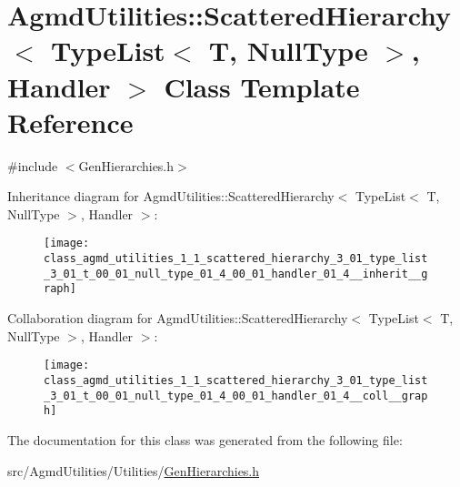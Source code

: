 \hypertarget{class_agmd_utilities_1_1_scattered_hierarchy_3_01_type_list_3_01_t_00_01_null_type_01_4_00_01_handler_01_4}{\section{Agmd\+Utilities\+:\+:Scattered\+Hierarchy$<$ Type\+List$<$ T, Null\+Type $>$, Handler $>$ Class Template Reference}
\label{class_agmd_utilities_1_1_scattered_hierarchy_3_01_type_list_3_01_t_00_01_null_type_01_4_00_01_handler_01_4}
}


{\ttfamily \#include $<$Gen\+Hierarchies.\+h$>$}



Inheritance diagram for Agmd\+Utilities\+:\+:Scattered\+Hierarchy$<$ Type\+List$<$ T, Null\+Type $>$, Handler $>$\+:\nopagebreak
\begin{figure}[H]
\begin{center}
\leavevmode
\texttt{[image: class\_agmd\_utilities\_1\_1\_scattered\_hierarchy\_3\_01\_type\_list\_3\_01\_t\_00\_01\_null\_type\_01\_4\_00\_01\_handler\_01\_4\_\_inherit\_\_graph]}
\end{center}
\end{figure}


Collaboration diagram for Agmd\+Utilities\+:\+:Scattered\+Hierarchy$<$ Type\+List$<$ T, Null\+Type $>$, Handler $>$\+:\nopagebreak
\begin{figure}[H]
\begin{center}
\leavevmode
\texttt{[image: class\_agmd\_utilities\_1\_1\_scattered\_hierarchy\_3\_01\_type\_list\_3\_01\_t\_00\_01\_null\_type\_01\_4\_00\_01\_handler\_01\_4\_\_coll\_\_graph]}
\end{center}
\end{figure}


The documentation for this class was generated from the following file\+:\begin{DoxyCompactItemize}
\item 
src/\+Agmd\+Utilities/\+Utilities/\hyperlink{_gen_hierarchies_8h}{Gen\+Hierarchies.\+h}\end{DoxyCompactItemize}
